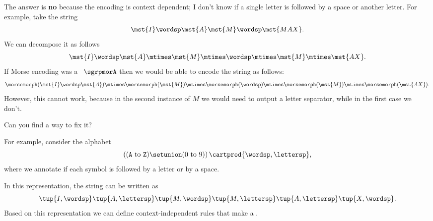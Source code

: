 %
\begin{solution}
    The answer is \textbf{no} because the encoding is context dependent; I don't know if a single letter is followed by a space or another letter.
    For example, take the string
    \begin{equation}
        \label{eq:max-iammax}
        \mst {I} \wordsp \mst{A} \mst{M}\wordsp \mst{MAX}.
    \end{equation}
    We can decompose it as follows
    \begin{equation}
        \label{eq:max-iammax-decomp}
        \mst{I}\wordsp \mst{A}\mtimes \mst{M} \mtimes \wordsp \mtimes \mst{M} \mtimes \mst{AX}.
    \end{equation}
    If Morse encoding was a \whomo~$\sgrpmorA$ then we would be able to encode the string as follows:
    \begin{equation}
        \label{eq:max-iammax-decomp-morph}
        \morsemorph(\mst{I}\wordsp \mst{A}) \mtimes \morsemorph (\mst{M}) \mtimes  \morsemorph(\wordsp) \mtimes  \morsemorph(\mst{M})
        \mtimes  \morsemorph(\mst{AX}).
    \end{equation}
    However, this cannot work, because in the second instance of $M$ we would need to output a letter separator, while in the first case we don't.

    Can you find a way to fix it?

    For example, consider the alphabet
    \begin{equation*}
        \left( (\texttt{A} \ \text{to}\ \texttt{Z}) \setunion (0 \ \text{to}\ 9) \right) \cartprod \{\wordsp, \lettersp\},
    \end{equation*}
    where we annotate if each symbol is followed by a letter or by a space.

    In this representation, the string can be written as
    \begin{equation*}
        \tup{I, \wordsp} \tup{A, \lettersp} \tup{ M, \wordsp} \tup{M, \lettersp} \tup{A, \lettersp}
        \tup{X, \wordsp}.
    \end{equation*}
    Based on this representation we can define context-independent rules that make a \whomo.
\end{solution}


